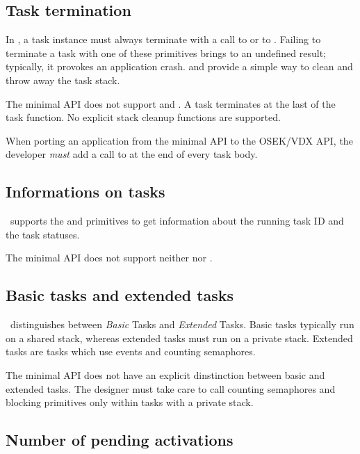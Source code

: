 \documentclass[12pt,a4paper,normalheadings,titlepage]{scrreprt}
\begin{document}
\subsection{Task termination}

In \ee, a task instance must always terminate with a call to
 or to . Failing to terminate a task
with one of these primitives brings to an undefined result; typically,
it provokes an application crash.  and
 provide a simple way to clean and throw away the task
stack.

The minimal API does not support  and
. A task terminates at the last \const{\}} of the task
function. No explicit stack cleanup functions are supported.
 
\begin{warning}
When porting an application from the minimal API to the OSEK/VDX API,
the developer {\em must} add a call to  at the end
of every task body.
\end{warning}

\subsection{Informations on tasks}

\ee\ supports the  and  primitives to
get information about the running task ID and the task statuses.

The minimal API does not support neither  nor . 

\subsection{Basic tasks and extended tasks}

\ee\ distinguishes between {\em Basic} Tasks and {\em Extended}
Tasks. Basic tasks typically run on a shared stack, whereas extended
tasks must run on a private stack. Extended tasks are tasks which use
events and counting semaphores.

The minimal API does not have an explicit dinstinction between basic and extended
tasks. The designer must take care to call counting semaphores and blocking
primitives only within tasks with a private stack.

\subsection{Number of pending activations}
\end{document}
